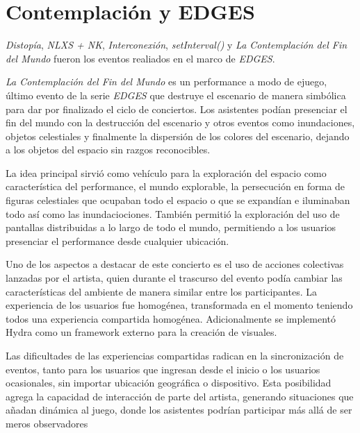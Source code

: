 
\section*{Contemplación y EDGES} %

\iffalse
\begin{itemize}
\item Distopía
\item domo 
\item Underborders
\item Milena y Concepción
\item setInterval()
\item Contemplación del fin del Mundo
\item sistemas mixtos
\item espacio y performance fusionados en Contemplación
\end{itemize}
\fi

\textit{Distopía}, \textit{NLXS + NK}, \textit{Interconexión}, \textit{setInterval()} y \textit{La Contemplación del Fin del Mundo} fueron los eventos realiados en el marco de \textit{EDGES}. 

\textit{La Contemplación del Fin del Mundo} es un performance a modo de ejuego, último evento de la serie \textit{EDGES} que destruye el escenario de manera simbólica para dar por finalizado el ciclo de conciertos. Los asistentes podían presenciar el fin del mundo con la destrucción del escenario y otros eventos como inundaciones, objetos celestiales y finalmente la dispersión de los colores del escenario, dejando a los objetos del espacio sin razgos reconocibles.

La idea principal sirvió como vehículo para la exploración del espacio como característica del performance, el mundo explorable, la persecución en forma de figuras celestiales que ocupaban todo el espacio o que se expandían e iluminaban todo así como las inundaciociones. También permitió la exploración del uso de pantallas distribuidas a lo largo de todo el mundo, permitiendo a los usuarios presenciar el performance desde cualquier ubicación.

Uno de los aspectos a destacar de este concierto es el uso de acciones colectivas lanzadas por el artista, quien durante el trascurso del evento podía cambiar las características del ambiente de manera similar entre los participantes. La experiencia de los usuarios fue homogénea, transformada en el momento teniendo todos una experiencia compartida homogénea. Adicionalmente se implementó Hydra como un framework externo para la creación de visuales.

Las dificultades de las experiencias compartidas radican en la sincronización de eventos, tanto para los usuarios que ingresan desde el inicio o los usuarios ocasionales, sin importar ubicación geográfica o dispositivo. Esta posibilidad agrega la capacidad de interacción de parte del artista, generando situaciones que añadan dinámica al juego, donde los asistentes podrían participar más allá de ser meros observadores

